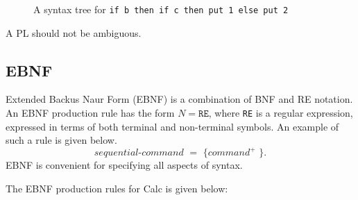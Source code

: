 \documentclass[a4paper, openany]{memoir}
\begin{document}
\begin{figure}[H]
    \centering
    \caption{A syntax tree for \texttt{if b then if c then put 1 else put 2}}
\end{figure}
\noindent A PL should not be ambiguous.

\subsection{EBNF}
Extended Backus Naur Form (EBNF) is a combination of BNF and RE notation. An EBNF production rule has the form $N = \texttt{RE}$, where \texttt{RE} is a regular expression, expressed in terms of both terminal and non-terminal symbols. An example of such a rule is given below.
\[\textit{sequential-command } = \texttt{ \{ } \textit{command}^{\texttt{+}} \texttt{ \}}.\]
EBNF is convenient for specifying all aspects of syntax.

The EBNF production rules for Calc is given below:
\end{document}

